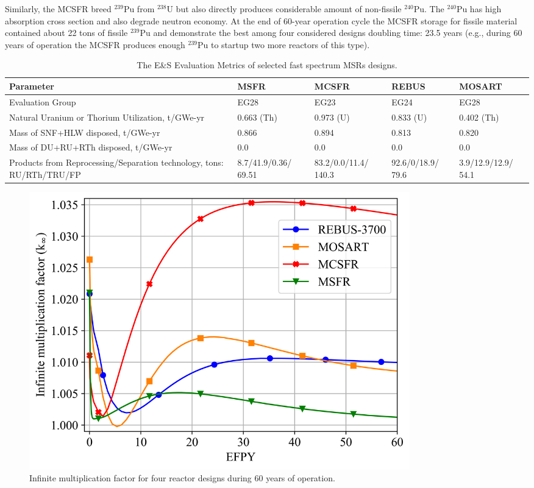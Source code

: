 \documentclass[letterpaper]{mandc2019}
\begin{document}
Similarly, the \gls{MCSFR} breed $^{239}$Pu from $^{238}$U but also directly produces considerable amount of non-fissile $^{240}$Pu. The $^{240}$Pu has high absorption cross section and also degrade neutron economy. At the end of 60-year operation cycle the \gls{MCSFR} storage for fissile material contained about 22 tons of fissile $^{239}$Pu and demonstrate the best among four considered designs doubling time: 23.5 years (e.g., during 60 years of operation the \gls{MCSFR} produces enough $^{239}$Pu to startup two more reactors of this type).

\begin{table}[hb!]
  \vspace{-0.3in}
  \centering
  \caption{The E\&S Evaluation Metrics of selected fast spectrum \glspl{MSR} designs.}
  \label{table:metrics}
  \begin{tabular}{p{} p{} p{} p{} p{}} \toprule
   Parameter &  \gls{MSFR} & \gls{MCSFR} & REBUS & \gls{MOSART} \\ \midrule
   Evaluation Group	&  EG28 & EG23 & EG24 & EG28   \\
   Natural Uranium or Thorium Utilization, t/GWe-yr & 0.663 (Th) & 0.973 (U) & 0.833 (U) & 0.402 (Th) \\
   Mass of \gls{SNF}+\gls{HLW} disposed, t/GWe-yr & 0.866 & 0.894 & 0.813 &  0.820 \\
   Mass of DU+RU+RTh disposed, t/GWe-yr & 0.0 & 0.0 & 0.0 &  0.0 \\
   Products from Reprocessing/Separation technology, tons: \gls{RU}/\gls{RTh}/\gls{TRU}/\gls{FP} &
   8.7/41.9/0.36/ 69.51 &  83.2/0.0/11.4/ 140.3 & 92.6/0/18.9/ 79.6 & 3.9/12.9/12.9/ 54.1  \\
 \bottomrule
  \end{tabular}
    \vspace{-0.2in}
\end{table}
\begin{figure}[!htb]
  \centering
  \includegraphics[width=0.8\textwidth]{./Figures/k_inf.png}
  \caption{Infinite multiplication factor for four reactor designs during 60 years of operation.}
  \label{fig:k_inf}
    \vspace{-0.5in}
\end{figure}
\end{document}
